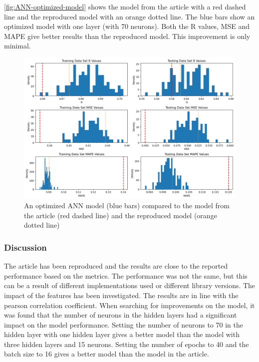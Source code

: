 \documentclass{article}
\begin{document}
\autoref{fig:ANN-optimized-model} shows the model from the article with a red dashed line and the reproduced model with an orange dotted line. The blue bars show an optimized model with one layer (with 70 neurons). Both the R values, MSE and MAPE give better results than the reproduced model. This improvement is only minimal.


\begin{figure}
	\centering
	\includegraphics[width=\linewidth]{figures/ANN_optimized_model.png}
	\caption{An optimized ANN model (blue bars) compared to the model from the article (red dashed line) and the reproduced model (orange dotted line)}
	\label{fig:ANN-optimized-model}
\end{figure}

\subsubsection{Discussion}
The article has been reproduced and the results are close to the reported performance based on the metrics.
The performance was not the same, but this can be a result of different implementations used or different library versions.
The impact of the features has been investigated. The results are in line with the pearson correlation coefficient.
When searching for improvements on the model, it was found that the number of neurons in the hidden layers had a significant impact on the model performance.
Setting the number of neurons to 70 in the hidden layer with one hidden layer gives a better model than the model with three hidden layers and 15 neurons.
Setting the number of epochs to 40 and the batch size to 16 gives a better model than the model in the article.
\end{document}
